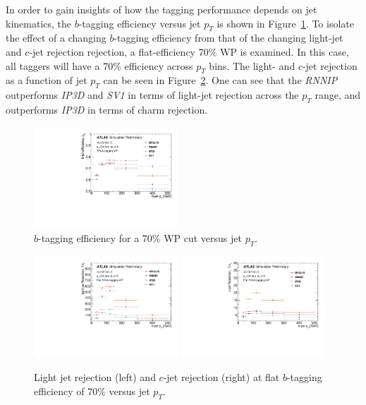 In order to gain insights of how the tagging performance depends on jet kinematics, the $b$-tagging efficiency versus jet $p_T$ is shown in Figure~\ref{fig:fixed_eff_pt}. To isolate the effect of a changing $b$-tagging efficiency from that of the changing light-jet and $c$-jet rejection rejection, a flat-efficiency 70\% WP is examined.  In this case, all taggers will have a 70\% efficiency across $p_T$ bins.  The light- and $c$-jet rejection as a function of jet $p_T$ can be seen in Figure~\ref{fig:flat_rej_pt}.  One can see that the \textit{RNNIP} outperforms \textit{IP3D} and \textit{SV1} in terms of light-jet rejection across the $p_T$ range, and outperforms \textit{IP3D} in terms of charm rejection.

\begin{figure}[htbp]
  \centering
 \includegraphics[width=0.48\textwidth]{figures/RNN/BEff_FixWP70.pdf}
\caption{$b$-tagging efficiency for a 70\% WP cut versus jet $p_T$. }
  \label{fig:fixed_eff_pt}
\end{figure}

\begin{figure}[htbp]
  \centering
 \includegraphics[width=0.48\textwidth]{figures/RNN/LRej_FlatEff.pdf}
  \includegraphics[width=0.48\textwidth]{figures/RNN/CRej_FlatEff.pdf}
\caption{Light jet rejection (left) and $c$-jet rejection (right) at flat $b$-tagging efficiency of 70\% versus jet $p_T$.}
  \label{fig:flat_rej_pt}
\end{figure}

